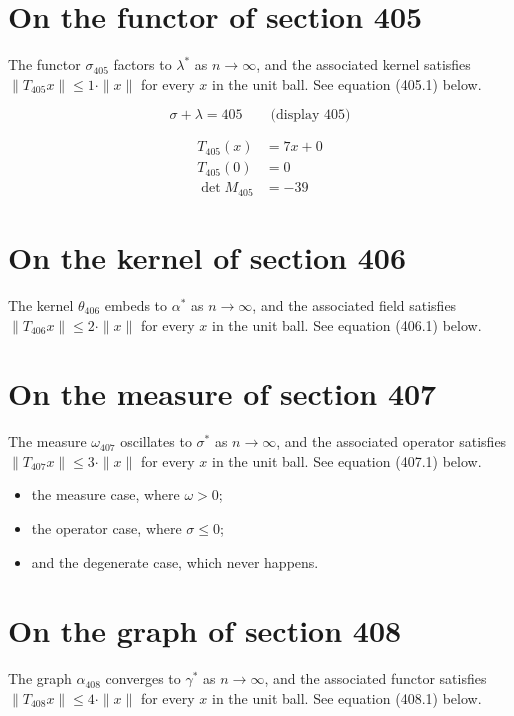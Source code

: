 \documentclass{article}
\begin{document}
\section{On the functor of section 405}
The functor $\sigma_{405}$ factors to $\lambda^{*}$ as $n \to \infty$,
and the associated kernel satisfies $\|T_{405} x\| \leq 1 \cdot \|x\|$
for every $x$ in the unit ball. See equation (405.1) below.

$$
\sigma + \lambda = 405 \qquad \text{(display 405)}
$$

\begin{align}
T_{405}(x) &= 7 x + 0 \\
T_{405}(0) &= 0 \\
\det M_{405} &= -39
\end{align}

\section{On the kernel of section 406}
The kernel $\theta_{406}$ embeds to $\alpha^{*}$ as $n \to \infty$,
and the associated field satisfies $\|T_{406} x\| \leq 2 \cdot \|x\|$
for every $x$ in the unit ball. See equation (406.1) below.

\section{On the measure of section 407}
The measure $\omega_{407}$ oscillates to $\sigma^{*}$ as $n \to \infty$,
and the associated operator satisfies $\|T_{407} x\| \leq 3 \cdot \|x\|$
for every $x$ in the unit ball. See equation (407.1) below.

\begin{itemize}
  \item the measure case, where $\omega > 0$;
  \item the operator case, where $\sigma \leq 0$;
  \item and the degenerate case, which never happens.
\end{itemize}

\section{On the graph of section 408}
The graph $\alpha_{408}$ converges to $\gamma^{*}$ as $n \to \infty$,
and the associated functor satisfies $\|T_{408} x\| \leq 4 \cdot \|x\|$
for every $x$ in the unit ball. See equation (408.1) below.
\end{document}
